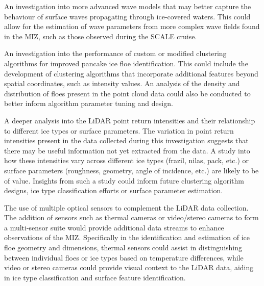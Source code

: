 An investigation into more advanced wave models that may better capture the behaviour of surface waves propagating through ice-covered waters. This could allow for the estimation of wave parameters from more complex wave fields found in the \ac{MIZ}, such as those observed during the \ac{SCALE} cruise.

An investigation into the performance of custom or modified clustering algorithms for improved pancake ice floe identification. This could include the development of clustering algorithms that incorporate additional features beyond spatial coordinates, such as intensity values. An analysis of the density and distribution of floes present in the point cloud data could also be conducted to better inform algorithm parameter tuning and design.

A deeper analysis into the \ac{LiDAR} point return intensities and their relationship to different ice types or surface parameters. The variation in point return intensities present in the data collected during this investigation suggests that there may be useful information not yet extracted from the data. A study into how these intensities vary across different ice types (frazil, nilas, pack, etc.) or surface parameters (roughness, geometry, angle of incidence, etc.) are likely to be of value. Insights from such a study could inform future clustering algorithm designs, ice type classification efforts or surface parameter estimation.

The use of multiple optical sensors to complement the \ac{LiDAR} data collection. The addition of sensors such as thermal cameras or video/stereo cameras to form a multi-sensor suite would provide additional data streams to enhance observations of the \ac{MIZ}. Specifically in the identification and estimation of ice floe geometry and dimensions, thermal sensors could assist in distinguishing between individual floes or ice types based on temperature differences, while video or stereo cameras could provide visual context to the \ac{LiDAR} data, aiding in ice type classification and surface feature identification.

